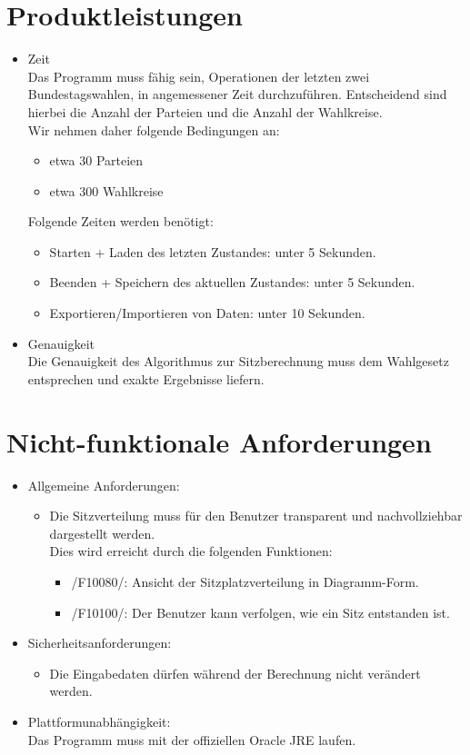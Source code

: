 \documentclass[10pt,a4paper]{article}
\begin{document}
\section{Produktleistungen}
\begin{itemize}
	\item Zeit \hfill \\
	Das Programm muss fähig sein, Operationen der letzten zwei Bundestagswahlen, in angemessener Zeit durchzuführen. Entscheidend sind hierbei die Anzahl der Parteien und die Anzahl der Wahlkreise.
	\\ Wir nehmen daher folgende Bedingungen an:
	\begin{itemize}
		\item etwa 30 Parteien
		\item etwa 300 Wahlkreise
	\end{itemize}
	Folgende Zeiten werden benötigt:
	\begin{itemize}
		\item Starten + Laden des letzten Zustandes: unter 5 Sekunden.
		\item Beenden + Speichern des aktuellen Zustandes: unter 5 Sekunden.
		\item Exportieren/Importieren von Daten: unter 10 Sekunden.
	\end{itemize}
	\item Genauigkeit \hfill \\
	Die Genauigkeit des Algorithmus zur Sitzberechnung muss dem Wahlgesetz entsprechen und exakte Ergebnisse liefern.
\end{itemize}


\section{Nicht-funktionale Anforderungen}
\begin{itemize}
	\item Allgemeine Anforderungen:
	\begin{itemize}
		\item Die Sitzverteilung muss für den Benutzer transparent und nachvollziehbar dargestellt werden. \hfill \\
		Dies wird erreicht durch die folgenden Funktionen:
		\begin{itemize}
			\item /F10080/: Ansicht der Sitzplatzverteilung in Diagramm-Form.
			\item /F10100/: Der Benutzer kann verfolgen, wie ein Sitz entstanden ist.
		\end{itemize}
	\end{itemize}
	\item Sicherheitsanforderungen:
	\begin{itemize}
		\item Die Eingabedaten dürfen während der Berechnung nicht verändert werden.
	\end{itemize}
	\item Plattformunabhängigkeit: \hfill \\
	Das Programm muss mit der offiziellen Oracle JRE laufen.
\end{itemize}
\end{document}
